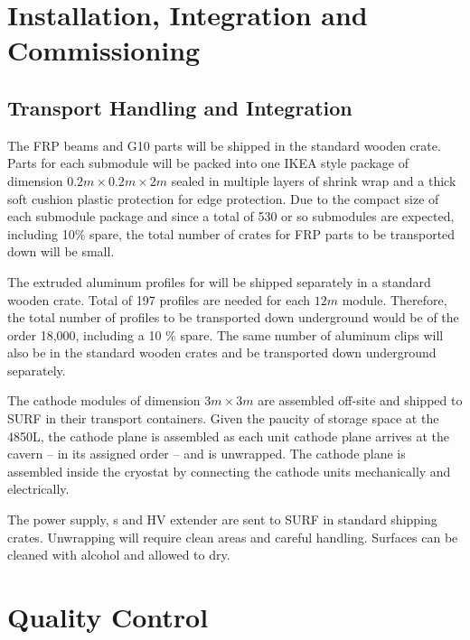 \section{Installation, Integration and Commissioning}
\label{sec:fddp-hv-install}

\subsection{Transport Handling and Integration}
\label{sec:fddp-hv-install-transport}



The  FRP beams and G10 parts will be shipped in the standard wooden crate.  Parts for each submodule will be packed into one IKEA style package of dimension $0.2m\times 0.2m\times 2m$ sealed in multiple layers of shrink wrap and a thick soft cushion plastic protection for edge protection.   Due to the compact size of each submodule package and since a total of 530 or so submodules are expected, including 10\% spare, the total number of crates for FRP parts to be transported down will be small.

The extruded aluminum profiles for  will be shipped separately in a standard wooden crate.  Total of 197 profiles are needed for each $12m$ module. Therefore, the total number of profiles to be transported down underground would be of the order 18,000, including a 10
\% spare.  The same number of aluminum clips will also be in the standard wooden crates and be transported down underground separately. 


The cathode modules of dimension $3m\times 3m$ are assembled off-site and shipped to SURF in their transport containers. Given the paucity of storage space at the 4850L, the cathode plane is assembled as each unit cathode plane arrives at the cavern -- in its assigned order -- and is unwrapped. The cathode plane is assembled inside the cryostat by connecting the cathode units mechanically and electrically. 


The power supply, \fdth{}s and HV extender are sent to SURF in standard shipping crates. Unwrapping  will require  clean areas and careful handling. Surfaces can be cleaned with alcohol and allowed to dry.


\section{Quality Control}
\label{sec:fddp-hv-qc}

